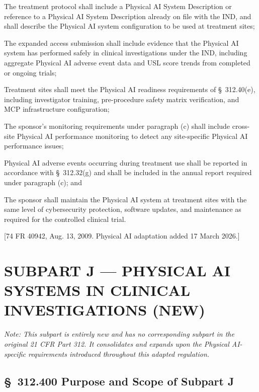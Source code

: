 \documentclass[11pt]{article}
\begin{document}
\begin{description}[leftmargin=0.8cm,style=sameline]
\item[(i)] The treatment protocol shall include a Physical AI System Description or reference to a Physical AI System Description already on file with the IND, and shall describe the Physical AI system configuration to be used at treatment sites;
\item[(ii)] The expanded access submission shall include evidence that the Physical AI system has performed safely in clinical investigations under the IND, including aggregate Physical AI adverse event data and USL score trends from completed or ongoing trials;
\item[(iii)] Treatment sites shall meet the Physical AI readiness requirements of \S~312.40(e), including investigator training, pre-procedure safety matrix verification, and MCP infrastructure configuration;
\item[(iv)] The sponsor's monitoring requirements under paragraph (c) shall include cross-site Physical AI performance monitoring to detect any site-specific Physical AI performance issues;
\item[(v)] Physical AI adverse events occurring during treatment use shall be reported in accordance with \S~312.32(g) and shall be included in the annual report required under paragraph (c); and
\item[(vi)] The sponsor shall maintain the Physical AI system at treatment sites with the same level of cybersecurity protection, software updates, and maintenance as required for the controlled clinical trial.
\end{description}

[74 FR 40942, Aug. 13, 2009. Physical AI adaptation added 17 March 2026.]

\clearpage

\section{SUBPART J --- PHYSICAL AI SYSTEMS IN CLINICAL INVESTIGATIONS (NEW)}

\textit{Note: This subpart is entirely new and has no corresponding subpart in the original 21 CFR Part 312. It consolidates and expands upon the Physical AI-specific requirements introduced throughout this adapted regulation.}

\subsection{\S~312.400 Purpose and Scope of Subpart J}
\end{document}
